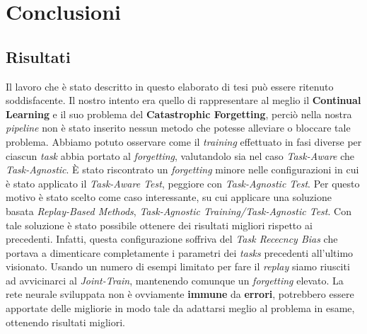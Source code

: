 \chapter{Conclusioni}\label{ch:conclusioni}
\section{Risultati}
Il lavoro che è stato descritto in questo elaborato di tesi può essere ritenuto soddisfacente. Il nostro intento era quello di rappresentare al meglio il \textbf{Continual Learning} e il suo problema del \textbf{Catastrophic Forgetting}, perciò nella nostra \textit{pipeline} non è stato inserito nessun metodo che potesse alleviare o bloccare tale problema. Abbiamo potuto osservare come il \textit{training} effettuato in fasi diverse per ciascun \textit{task} abbia portato al \textit{forgetting}, valutandolo sia nel caso \textit{Task-Aware} che \textit{Task-Agnostic}.\newline
È stato riscontrato un \textit{forgetting} minore nelle configurazioni in cui è stato applicato il \textit{Task-Aware Test}, peggiore con \textit{Task-Agnostic Test}. Per questo motivo è stato scelto come caso interessante, su cui applicare una soluzione basata \textit{Replay-Based Methods}, \textit{Task-Agnostic Training/Task-Agnostic Test}.
Con tale soluzione è stato possibile ottenere dei risultati migliori rispetto ai precedenti. Infatti, questa configurazione soffriva del \textit{Task Rececncy Bias} che portava a dimenticare completamente i parametri dei \textit{tasks} precedenti all'ultimo visionato. Usando un numero di esempi limitato per fare il \textit{replay} siamo riusciti ad avvicinarci al \textit{Joint-Train}, mantenendo comunque un \textit{forgetting} elevato.
La rete neurale sviluppata non è ovviamente \textbf{immune} da \textbf{errori}, potrebbero essere apportate delle migliorie in modo tale da adattarsi meglio al problema in esame, ottenendo  risultati migliori.
